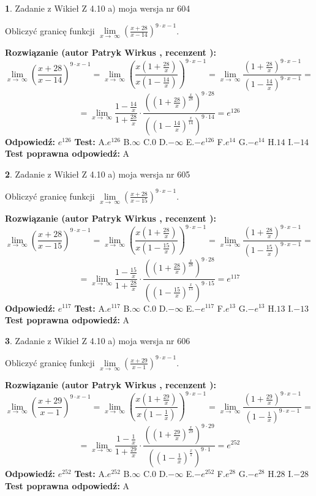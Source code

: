 \documentclass[12pt, a4paper]{article}
\theoremstyle{definition} %
\newtheorem{zad}{}
\newcommand{\zadStart}[1]{\begin{zad}#1\newline}
\newcommand{\zadStop}{\end{zad}}
\newcommand{\rozwStart}[2]{\noindent \textbf{Rozwiązanie (autor #1 , recenzent #2): }\newline}
\newcommand{\rozwStop}{\newline}
\newcommand{\odpStart}{\noindent \textbf{Odpowiedź:}\newline}
\newcommand{\odpStop}{\newline}
\newcommand{\testStart}{\noindent \textbf{Test:}\newline}
\newcommand{\testStop}{\newline}
\newcommand{\kluczStart}{\noindent \textbf{Test poprawna odpowiedź:}\newline}
\newcommand{\kluczStop}{\newline}
\begin{document}
\zadStart{Zadanie z Wikieł Z 4.10 a) moja wersja nr 604}

Obliczyć granicę funkcji  $\lim\limits_{x\to\ \infty}(\frac{x+28}{x-14})^{9\cdot x-1}$.
\zadStop
\rozwStart{Patryk Wirkus}{}
$$\lim\limits_{x\to\ \infty}(\frac{x+28}{x-14})^{9\cdot x-1} = \lim\limits_{x\to\ \infty}(\frac{x(1+\frac{28}{x})}{x(1-\frac{14}{x})})^{9\cdot x-1}=\lim\limits_{x\to\ \infty}\frac{(1+\frac{28}{x})^{9\cdot x-1}}{(1-\frac{14}{x})^{9\cdot x-1}}=$$
$$=\lim\limits_{x\to\ \infty}\frac{1-\frac{14}{x}}{1+\frac{28}{x}}\cdot\frac{((1+\frac{28}{x})^{\frac{x}{28}})^{9\cdot28}}{((1-\frac{14}{x})^{\frac{x}{14}})^{9\cdot14}}=e^{126}$$
\rozwStop
\odpStart
$e^{126}$
\odpStop
\testStart
A.$e^{126}$ B.$\infty$ C.$0$ D.$-\infty$ E.$-e^{126}$
F.$e^{14}$ G.$-e^{14}$
H.$14$
I.$-14$
\testStop
\kluczStart
A
\kluczStop



\zadStart{Zadanie z Wikieł Z 4.10 a) moja wersja nr 605}

Obliczyć granicę funkcji  $\lim\limits_{x\to\ \infty}(\frac{x+28}{x-15})^{9\cdot x-1}$.
\zadStop
\rozwStart{Patryk Wirkus}{}
$$\lim\limits_{x\to\ \infty}(\frac{x+28}{x-15})^{9\cdot x-1} = \lim\limits_{x\to\ \infty}(\frac{x(1+\frac{28}{x})}{x(1-\frac{15}{x})})^{9\cdot x-1}=\lim\limits_{x\to\ \infty}\frac{(1+\frac{28}{x})^{9\cdot x-1}}{(1-\frac{15}{x})^{9\cdot x-1}}=$$
$$=\lim\limits_{x\to\ \infty}\frac{1-\frac{15}{x}}{1+\frac{28}{x}}\cdot\frac{((1+\frac{28}{x})^{\frac{x}{28}})^{9\cdot28}}{((1-\frac{15}{x})^{\frac{x}{15}})^{9\cdot15}}=e^{117}$$
\rozwStop
\odpStart
$e^{117}$
\odpStop
\testStart
A.$e^{117}$ B.$\infty$ C.$0$ D.$-\infty$ E.$-e^{117}$
F.$e^{13}$ G.$-e^{13}$
H.$13$
I.$-13$
\testStop
\kluczStart
A
\kluczStop



\zadStart{Zadanie z Wikieł Z 4.10 a) moja wersja nr 606}

Obliczyć granicę funkcji  $\lim\limits_{x\to\ \infty}(\frac{x+29}{x-1})^{9\cdot x-1}$.
\zadStop
\rozwStart{Patryk Wirkus}{}
$$\lim\limits_{x\to\ \infty}(\frac{x+29}{x-1})^{9\cdot x-1} = \lim\limits_{x\to\ \infty}(\frac{x(1+\frac{29}{x})}{x(1-\frac{1}{x})})^{9\cdot x-1}=\lim\limits_{x\to\ \infty}\frac{(1+\frac{29}{x})^{9\cdot x-1}}{(1-\frac{1}{x})^{9\cdot x-1}}=$$
$$=\lim\limits_{x\to\ \infty}\frac{1-\frac{1}{x}}{1+\frac{29}{x}}\cdot\frac{((1+\frac{29}{x})^{\frac{x}{29}})^{9\cdot29}}{((1-\frac{1}{x})^{\frac{x}{1}})^{9\cdot1}}=e^{252}$$
\rozwStop
\odpStart
$e^{252}$
\odpStop
\testStart
A.$e^{252}$ B.$\infty$ C.$0$ D.$-\infty$ E.$-e^{252}$
F.$e^{28}$ G.$-e^{28}$
H.$28$
I.$-28$
\testStop
\kluczStart
A
\kluczStop
\end{document}
